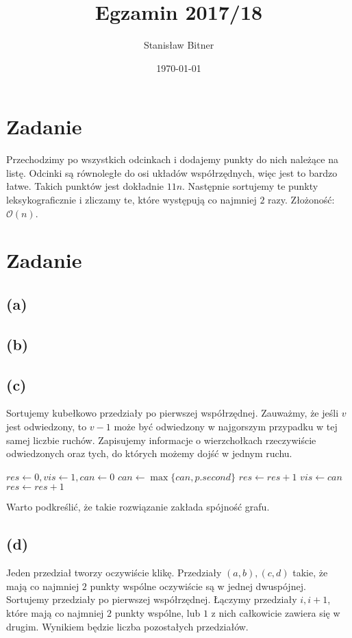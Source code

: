 \documentclass[12pt, a4paper]{article}
\title{Egzamin 2017/18}
\author{Stanisław Bitner}
\date{\today}
\newcommand{\MCALO}{\mathcal{O}}
\newcounter{zadanie}
\newcommand{\zadanie}{\addtocounter{zadanie}{1}\section*{Zadanie \arabic{zadanie}}}
\begin{document}
\maketitle
\zadanie{}
Przechodzimy po wszystkich odcinkach i dodajemy punkty do nich należące na
listę. Odcinki są równoległe do osi układów współrzędnych, więc jest to bardzo
łatwe. Takich punktów jest dokładnie $11n$. Następnie sortujemy te punkty
leksykograficznie i zliczamy te, które występują co najmniej $2$ razy.
Złożoność: $\MCALO(n)$.

\zadanie{}
\subsection*{(a)}

\subsection*{(b)}

\subsection*{(c)}
Sortujemy kubełkowo przedziały po pierwszej współrzędnej. Zauważmy, że jeśli
$v$ jest odwiedzony, to $v-1$ może być odwiedzony w najgorszym przypadku w tej
samej liczbie ruchów. Zapisujemy informacje o wierzchołkach rzeczywiście odwiedzonych
oraz tych, do których możemy dojść w jednym ruchu.
\begin{algorithmic}

  \State $res \gets 0, vis \gets 1, can \gets 0$
      \State $can \gets \max\{can, p.second\}$
    \Else
      \State $res \gets res+1$
      \State $vis \gets can$
    \EndIf
  \EndFor
    \State $res \gets res + 1$
  \EndIf

\end{algorithmic}
Warto podkreślić, że takie rozwiązanie zakłada spójność grafu.

\subsection*{(d)}
Jeden przedział tworzy oczywiście klikę. Przedziały $(a,b), (c,d)$ takie, że
mają co najmniej $2$ punkty wspólne oczywiście są w jednej dwuspójnej.
Sortujemy przedziały po pierwszej współrzędnej. Łączymy przedziały $i,i+1$,
które mają co najmniej $2$ punkty wspólne, lub $1$ z nich całkowicie zawiera
się w drugim. Wynikiem będzie liczba pozostałych przedziałów.
\end{document}
